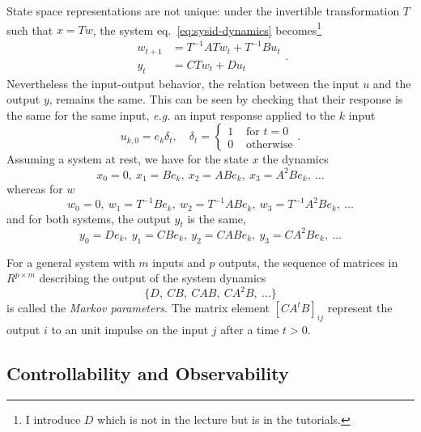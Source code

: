 State space representations are not unique: under the invertible transformation $T$ such that $x=Tw$, the system eq.~\eqref{eq:sysid-dynamics} becomes\footnote{I introduce $D$ which is not in the lecture but is in the tutorials.}
\begin{equation*}
  \begin{aligned}
    w_{t+1} &= T^{-1}ATw_t + T^{-1}Bu_t \\
    y_t &= CTw_t + Du_t
  \end{aligned}.
\end{equation*}
Nevertheless the input-output behavior, the relation between the input $u$ and the output $y$, remains the same. This can be seen by checking that their response is the same for the same input, \textit{e.g.} an input response applied to the $k$ input
\begin{equation*}
  u_{k,0} = e_k\delta_t,\quad \delta_t =
  \begin{cases}
    1 & \text{ for } t=0 \\
    0 & \text{ otherwise}
  \end{cases}.
\end{equation*}
Assuming a system at rest, we have for the state $x$ the dynamics
\begin{equation*}
  x_0=0,\ x_1=Be_k,\ x_2=ABe_k,\ x_3=A^2Be_k,\ \ldots
\end{equation*}
whereas for $w$
\begin{equation*}
  w_0=0,\ w_1=T^{-1}Be_k,\ w_2=T^{-1}ABe_k,\ w_3=T^{-1}A^2Be_k,\ \ldots
\end{equation*}
and for both systems, the output $y_t$ is the same,
\begin{equation*}
  y_0=De_k,\ y_1=CBe_k,\ y_2=CABe_k,\ y_3=CA^2Be_k,\ \ldots
\end{equation*}

For a general system with $m$ inputs and $p$ outputs, the sequence of matrices in $R^{p\times m}$ describing the output of the system dynamics
\begin{equation}
  \label{eq:markov-parameters}
  \{D,\ CB,\ CAB,\ CA^2B,\ \ldots\}
\end{equation}
is called the \emph{Markov parameters}. The matrix element $\left[CA^tB\right]_{ij}$ represent the output $i$ to an unit impulse on the input $j$ after a time $t>0$.

\subsection{Controllability and Observability}
\label{sec:controllability-observability}

